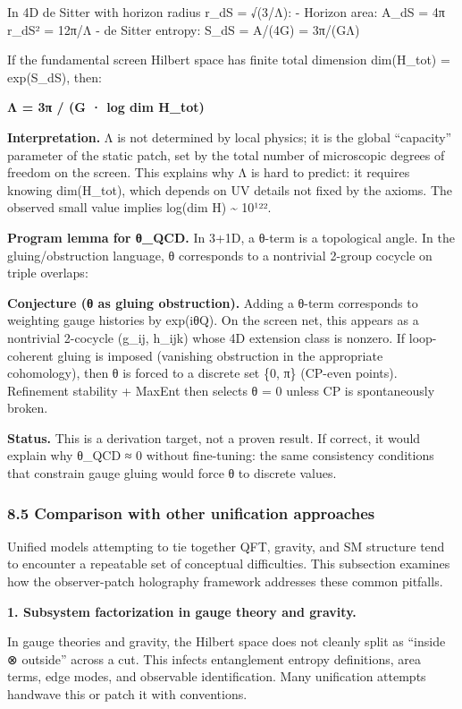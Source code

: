 \documentclass[11pt,a4paper]{article}
\theoremstyle{remark}
\begin{document}
In 4D de Sitter with horizon radius r\_dS = √(3/Λ):
- Horizon area: A\_dS = 4π r\_dS² = 12π/Λ
- de Sitter entropy: S\_dS = A/(4G) = 3π/(GΛ)

If the fundamental screen Hilbert space has finite total dimension dim(H\_tot) = exp(S\_dS), then:

\textbf{Λ = 3π / (G · log dim H\_tot)}

\textbf{Interpretation.} Λ is not determined by local physics; it is the global ``capacity'' parameter of the static patch, set by the total number of microscopic degrees of freedom on the screen. This explains why Λ is hard to predict: it requires knowing dim(H\_tot), which depends on UV details not fixed by the axioms. The observed small value implies log(dim H) \textasciitilde{} 10¹²².

\textbf{Program lemma for θ\_QCD.} In 3+1D, a θ-term is a topological angle. In the gluing/obstruction language, θ corresponds to a nontrivial 2-group cocycle on triple overlaps:

\textbf{Conjecture (θ as gluing obstruction).} Adding a θ-term corresponds to weighting gauge histories by exp(iθQ). On the screen net, this appears as a nontrivial 2-cocycle (g\_ij, h\_ijk) whose 4D extension class is nonzero. If loop-coherent gluing is imposed (vanishing obstruction in the appropriate cohomology), then θ is forced to a discrete set \{0, π\} (CP-even points). Refinement stability + MaxEnt then selects θ = 0 unless CP is spontaneously broken.

\textbf{Status.} This is a derivation target, not a proven result. If correct, it
would explain why θ\_QCD ≈ 0 without fine-tuning: the same consistency
conditions that constrain gauge gluing would force θ to discrete values.

\subsubsection{8.5 Comparison with other unification approaches}\label{comparison-with-other-unification-approaches}

Unified models attempting to tie together QFT, gravity, and SM structure tend to encounter a repeatable set of conceptual difficulties. This subsection examines how the observer-patch holography framework addresses these common pitfalls.

\textbf{1. Subsystem factorization in gauge theory and gravity.}

In gauge theories and gravity, the Hilbert space does not cleanly split as ``inside ⊗ outside'' across a cut. This infects entanglement entropy definitions, area terms, edge modes, and observable identification. Many unification attempts handwave this or patch it with conventions.
\end{document}
